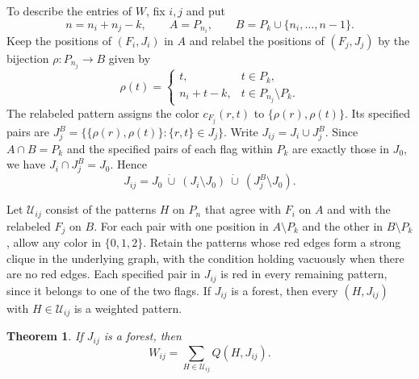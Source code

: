 \documentclass[preprint,11pt,numbers]{elsarticle-arxiv}
\numberwithin{equation}{section}
\newtheorem{theorem}{Theorem}[section]
\theoremstyle{definition}
\begin{document}
To describe the entries of $W$, fix $i,j$ and put
\[
 n=n_i+n_j-k,\qquad A=P_{n_i},\qquad
 B=P_k\cup\{n_i,\ldots,n-1\}.
\]
Keep the positions of $(F_i,J_i)$ in $A$ and relabel the positions
of $(F_j,J_j)$ by the bijection $\rho\colon P_{n_j}\to B$ given by
\begin{equation}\label{eq:flag-relabeling}
 \rho(t)=
 \begin{cases}
  t,& t\in P_k,\\
  n_i+t-k,& t\in P_{n_j}\setminus P_k .
 \end{cases}
\end{equation}
The relabeled pattern assigns the color $c_{F_j}(r,t)$ to
$\{\rho(r),\rho(t)\}$. Its specified pairs are
$J_j^B=\{\{\rho(r),\rho(t)\}:\{r,t\}\in J_j\}$.
Write $J_{ij}=J_i\cup J_j^B$. Since $A\cap B=P_k$ and the specified
pairs of each flag within $P_k$ are exactly those in $J_0$, we
have $J_i\cap J_j^B=J_0$. Hence
\[
 J_{ij}=J_0\ \dot\cup\ (J_i\setminus J_0)\
              \dot\cup\ (J_j^B\setminus J_0).
\]

Let $\mathcal U_{ij}$ consist of the patterns $H$ on $P_n$ that
agree with $F_i$ on $A$ and with the relabeled $F_j$ on $B$.
For each pair with one position in $A\setminus P_k$ and the other
in $B\setminus P_k$, allow any color in $\{0,1,2\}$. Retain the
patterns whose red edges form a strong clique in the underlying
graph, with the condition holding vacuously when there are no red
edges. Each specified pair in $J_{ij}$ is red in every remaining
pattern, since it belongs to one of the two flags. If $J_{ij}$ is
a forest, then every $(H,J_{ij})$ with $H\in\mathcal U_{ij}$ is a
weighted pattern.

\begin{theorem}\label{thm:weighted-flag-inequality}
If $J_{ij}$ is a forest, then
\begin{equation}\label{eq:weighted-matrix-entry}
 W_{ij}=\sum_{H\in\mathcal U_{ij}}Q(H,J_{ij}).
\end{equation}
\end{theorem}
\end{document}
